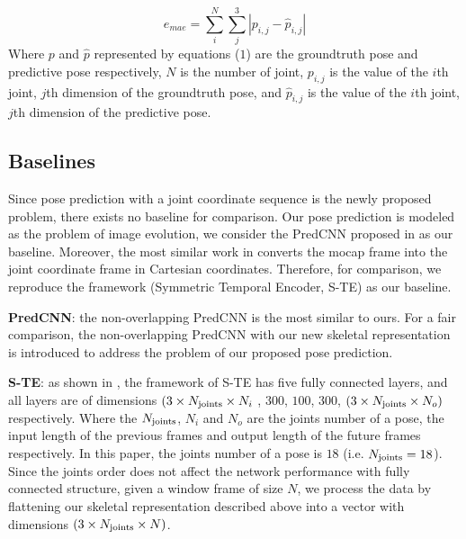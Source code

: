 \documentclass[journal]{IEEEtran}
\begin{document}
\begin{equation}
\label{eqn4}
{e_{mae}} = \sum\limits_i^N {\sum\limits_j^3 {|{p_{i,j}} - {{\widehat p}_{i,j}}|} }
\end{equation}
Where ${p}$ and ${\widehat p}$  represented by equations (${1}$) are the groundtruth pose and predictive pose respectively, ${N}$ is the number of joint, ${p_{i,j}}$ is the value of the ${i}$th joint, ${j}$th dimension of the groundtruth pose, and ${\widehat p_{i,j}}$ is the value of the ${i}$th joint, ${j}$th dimension of the predictive pose.

\subsection{Baselines}
Since pose prediction with a joint coordinate sequence is the newly proposed problem, there exists no baseline for comparison. Our pose prediction is modeled as the problem of image evolution, we consider the PredCNN proposed in \cite{predcnn} as our baseline. Moreover, the most similar work in \cite{ButepageDRL} converts the mocap frame into the joint coordinate frame in Cartesian coordinates. Therefore, for comparison, we reproduce the framework (Symmetric Temporal Encoder, S-TE) as our baseline.

{\bf PredCNN}: the non-overlapping PredCNN is the most similar to ours. For a fair comparison, the non-overlapping PredCNN with our new skeletal representation is introduced to address the problem of our proposed pose prediction.

{\bf S-TE}: as shown in \cite{ButepageDRL}, the framework of S-TE has five fully connected layers, and all layers are of dimensions ${(3 \times {N_{{\rm{joints}}}} \times {N_i}}$ , ${300}$, ${100}$, ${300}$, ${(3 \times {N_{{\rm{joints}}}} \times {N_o})}$ respectively. Where the ${{N_{{\rm{joints}}}}}$, ${N_i}$ and ${N_o}$ are the joints number of a pose, the input length of the previous frames and output length of the future frames respectively. In this paper, the joints number of a pose is ${18}$ (i.e. ${{N_{{\rm{joints}}}} = 18}$). Since the joints order does not affect the network performance with fully connected structure, given a window frame of size ${N}$, we process the data by flattening our skeletal representation described above into a vector with dimensions ${(3 \times {N_{{\rm{joints}}}} \times N)}$.
\end{document}

